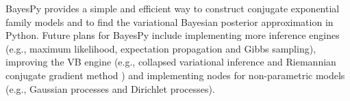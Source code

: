 \documentclass[twoside,11pt]{article}
\begin{document}
BayesPy provides a simple and efficient way to construct conjugate exponential
family models and to find the variational Bayesian posterior approximation in
Python.
%
Future plans for BayesPy include implementing more inference engines (e.g.,
maximum likelihood, expectation propagation and Gibbs sampling), improving the
VB engine (e.g., collapsed variational inference \citep{Hensman:2012} and
Riemannian conjugate gradient method \citep{Honkela:2010}) and implementing nodes
for non-parametric models (e.g., Gaussian processes and Dirichlet processes).







\vskip 0.2in

\end{document}
